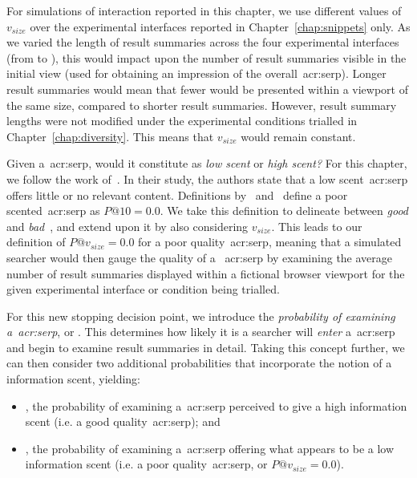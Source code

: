 For simulations of interaction reported in this chapter, we use different values of $v_{size}$ over the experimental interfaces reported in Chapter~\ref{chap:snippets} only. As we varied the length of result summaries across the four experimental interfaces (from  to ), this would impact upon the number of result summaries visible in the initial view (used for obtaining an impression of the overall~\gls{acr:serp}). Longer result summaries would mean that fewer would be presented within a viewport of the same size, compared to shorter result summaries. However, result summary lengths were not modified under the experimental conditions trialled in Chapter~\ref{chap:diversity}. This means that $v_{size}$ would remain constant.

 Given a~\gls{acr:serp}, would it constitute as \emph{low scent} or \emph{high scent?} For this chapter, we follow the work of~\cite{wu2014information_scent}. In their study, the authors state that a low scent~\gls{acr:serp} offers little or no relevant content. Definitions by~\cite{wu2014information_scent} and~\cite{hassan2013serp_abandonment} define a poor scented~\gls{acr:serp} as $P@10=0.0$. We take this definition to delineate between \emph{good} and \emph{bad}~, and extend upon it by also considering $v_{size}$. This leads to our definition of $P@v_{size}=0.0$ for a poor quality~\gls{acr:serp}, meaning that a simulated searcher would then gauge the quality of a ~\gls{acr:serp} by examining the average number of result summaries displayed within a fictional browser viewport for the given experimental interface or condition being trialled.

 For this new stopping decision point, we introduce the \emph{probability of examining a~\gls{acr:serp}}, or . This determines how likely it is a searcher will \emph{enter} a~\gls{acr:serp} and begin to examine result summaries in detail. Taking this concept further, we can then consider two additional probabilities that incorporate the notion of a~ information scent, yielding:

\begin{itemize}
    \item{, the probability of examining a~\gls{acr:serp} perceived to give a high information scent (i.e. a good quality~\gls{acr:serp}); and}
    \item{, the probability of examining a~\gls{acr:serp} offering what appears to be a low information scent (i.e. a poor quality~\gls{acr:serp}, or $P@v_{size}=0.0$).}
\end{itemize}

